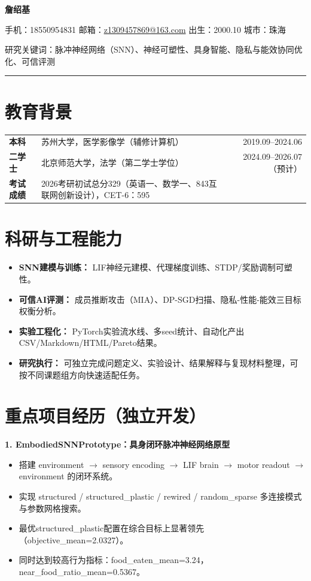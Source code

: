 \documentclass[11pt,a4paper]{ctexart}
\begin{document}
{\LARGE\bfseries\color{Accent} 詹绍基}

\vspace{4pt}
\textcolor{TextGray}{手机：18550954831 \quad 邮箱：\href{mailto:z1309457869@163.com}{z1309457869@163.com} \quad 出生：2000.10 \quad 城市：珠海}

\vspace{4pt}
\textcolor{TextGray}{研究关键词：脉冲神经网络（SNN）、神经可塑性、具身智能、隐私与能效协同优化、可信评测}

\vspace{4pt}
\noindent\textcolor{LightGray}{\rule{\textwidth}{0.5pt}}

\section*{教育背景}
\begin{tabularx}{\textwidth}{>{\bfseries}p{2.2cm}Xr}
本科 & 苏州大学，医学影像学（辅修计算机） & 2019.09--2024.06 \\
二学士 & 北京师范大学，法学（第二学士学位） & 2024.09--2026.07（预计） \\
考试成绩 & 2026考研初试总分329（英语一、数学一、843互联网创新设计），CET-6：595 & \\
\end{tabularx}

\section*{科研与工程能力}
\begin{itemize}
  \item \textbf{SNN建模与训练：} LIF神经元建模、代理梯度训练、STDP/奖励调制可塑性。
  \item \textbf{可信AI评测：} 成员推断攻击（MIA）、DP-SGD扫描、隐私-性能-能效三目标权衡分析。
  \item \textbf{实验工程化：} PyTorch实验流水线、多seed统计、自动化产出CSV/Markdown/HTML/Pareto结果。
  \item \textbf{研究执行：} 可独立完成问题定义、实验设计、结果解释与复现材料整理，可按不同课题组方向快速适配任务。
\end{itemize}

\section*{重点项目经历（独立开发）}
\textbf{1. EmbodiedSNNPrototype：具身闭环脉冲神经网络原型}
\begin{itemize}
  \item 搭建 environment $\rightarrow$ sensory encoding $\rightarrow$ LIF brain $\rightarrow$ motor readout $\rightarrow$ environment 的闭环系统。
  \item 实现 structured / structured\_plastic / rewired / random\_sparse 多连接模式与参数网格搜索。
  \item 最优structured\_plastic配置在综合目标上显著领先（objective\_mean=2.0327）。
  \item 同时达到较高行为指标：food\_eaten\_mean=3.24，near\_food\_ratio\_mean=0.5367。
\end{itemize}
\end{document}
